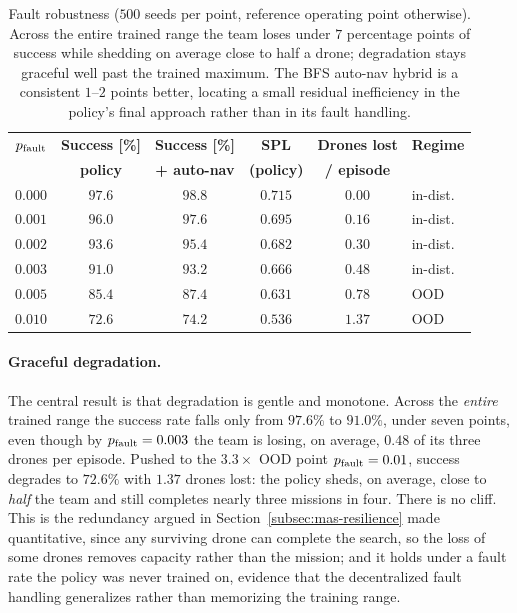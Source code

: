 \begin{table}[t]
\centering
\small
\begin{tabular}{lccccl}
\toprule
$p_{\mathrm{fault}}$ & \textbf{Success [\%]} & \textbf{Success [\%]} & \textbf{SPL} &
\textbf{Drones lost} & \textbf{Regime} \\
 & \textbf{policy} & \textbf{+ auto-nav} & \textbf{(policy)} &
\textbf{/ episode} & \\
\midrule
$0.000$ & $97.6$ & $98.8$ & $0.715$ & $0.00$ & in-dist. \\
$0.001$ & $96.0$ & $97.6$ & $0.695$ & $0.16$ & in-dist. \\
$0.002$ & $93.6$ & $95.4$ & $0.682$ & $0.30$ & in-dist. \\
$0.003$ & $91.0$ & $93.2$ & $0.666$ & $0.48$ & in-dist. \\
\midrule
$0.005$ & $85.4$ & $87.4$ & $0.631$ & $0.78$ & OOD \\
$0.010$ & $72.6$ & $74.2$ & $0.536$ & $1.37$ & OOD \\
\bottomrule
\end{tabular}
\caption{Fault robustness ($500$ seeds per point, reference operating point
otherwise). Across the entire trained range the team loses under $7$
percentage points of success while shedding on average close to half a
drone; degradation stays graceful well past the trained maximum. The BFS
auto-nav hybrid is a consistent $1\text{--}2$ points better, locating a
small residual inefficiency in the policy's final approach rather than in its
fault handling.}
\label{tab:fault}
\end{table}

\paragraph{Graceful degradation.}
The central result is that degradation is gentle and monotone. Across the
\emph{entire} trained range the success rate falls only from $97.6\%$ to
$91.0\%$, under seven points, even though by $p_{\mathrm{fault}} = 0.003$ the team is losing,
on average, $0.48$ of its three drones per episode. Pushed to the $3.3\times$ OOD
point $p_{\mathrm{fault}} = 0.01$, success degrades to $72.6\%$ with $1.37$ drones lost: the
policy sheds, on average, close to \emph{half} the team and still completes
nearly three missions in four. There is no cliff. This is the redundancy argued in
Section~\ref{subsec:mas-resilience} made quantitative, since any surviving drone
can complete the search, so the loss of some drones removes capacity rather than
the mission; and it holds under a fault rate the policy was never trained on,
evidence that the decentralized fault handling generalizes rather than memorizing
the training range.

